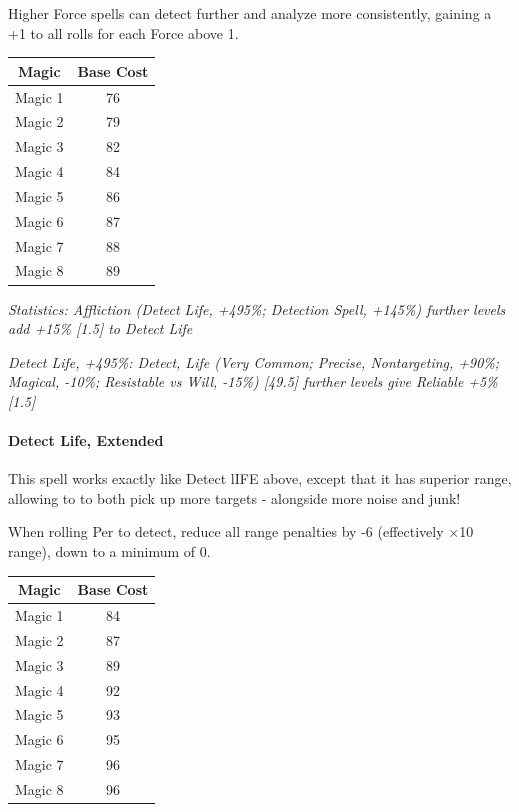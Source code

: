 \begin{multicols}{3}
	Higher Force spells can detect further and analyze more consistently, gaining a +1 to all rolls for each Force above 1.	
	
	\begin{center}
		\begin{tabular}{|c|c|}
			\hline
			Magic & Base Cost \\
			\hline
			\hline
			Magic 1 & 76 \\
			Magic 2 & 79 \\
			Magic 3 & 82 \\
			Magic 4 & 84 \\
			Magic 5 & 86 \\
			Magic 6 & 87 \\
			Magic 7 & 88 \\
			Magic 8 & 89 \\
			\hline
		\end{tabular}
	\end{center} 	
	
	\textcolor{OliveGreen}{\textit{ Statistics: Affliction (Detect Life, +495\%; Detection Spell, +145\%) further levels add +15\% [1.5] to Detect Life}}
	
	\textcolor{OliveGreen}{\textit{Detect Life, +495\%: Detect, Life (Very Common; Precise, Nontargeting, +90\%; Magical, -10\%; Resistable vs Will, -15\%) [49.5] further levels give Reliable +5\% [1.5]}}
	
	\paragraph{Detect Life, Extended}
	
	This spell works exactly like Detect lIFE above, except that it has superior range, allowing to to both pick up more targets - alongside more noise and junk!
	
	When rolling Per to detect, reduce all range penalties by -6 (effectively $\times$10 range), down to a minimum of 0.
	
	\begin{center}
		\begin{tabular}{|c|c|}
			\hline
			Magic & Base Cost \\
			\hline
			\hline
			Magic 1 & 84 \\
			Magic 2 & 87 \\
			Magic 3 & 89 \\
			Magic 4 & 92 \\
			Magic 5 & 93 \\
			Magic 6 & 95 \\
			Magic 7 & 96 \\
			Magic 8 & 96 \\
			\hline
		\end{tabular}
	\end{center} 
	

\end{multicols}
